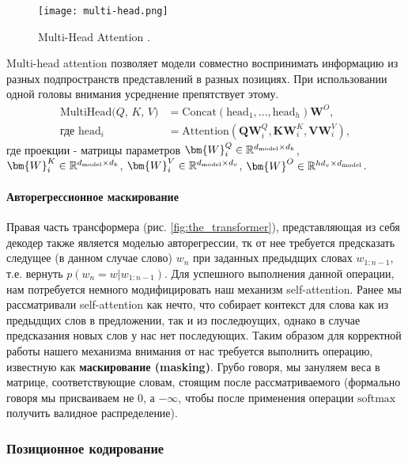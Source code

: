 \begin{figure}[h!]
    \centering
    \texttt{[image: multi-head.png]}
    \caption{Multi-Head Attention \cite{vaswani2017attention}.}
    \label{fig:multi-head}
\end{figure}

Multi-head attention позволяет модели совместно воспринимать информацию из 
разных подпространств представлений в разных позициях. При использовании одной 
головы внимания усреднение препятствует этому.
\begin{align*}
    \text{MultiHead($Q$, $K$, $V$)} &= \text{Concat}(\text{head}_1, ..., \text{head}_h)\bm{W}^O, \\
    \text{где } \text{head}_i &= \text{Attention}(\bm{Q}\bm{W}_i^Q, \bm{K}\bm{W}_i^K, \bm{V}\bm{W}_i^V),
\end{align*}
где проекции - матрицы параметров 
$\bm{W}_i^Q \in \mathbb{R}^{d_\text{\tiny model} \times d_k}$, 
$\bm{W}_i^K \in \mathbb{R}^{d_\text{\tiny model} \times d_k}$, 
$\bm{W}_i^V \in \mathbb{R}^{d_\text{\tiny model} \times d_v}$, 
$\bm{W}^O \in \mathbb{R}^{h d_v \times d_\text{\tiny model}}$.

\paragraph{Авторегрессионное маскирование}

Правая часть трансформера (рис. \ref{fig:the_transformer}), представляющая из себя 
декодер также является моделью авторегрессии, тк от нее требуется предсказать 
следущее (в данном случае слово) $w_n$ при заданных предыдщих словах $w_{1:n-1}$, 
т.е. вернуть $p(w_n = w|w_{1:n-1})$. Для успешного выполнения данной операции, нам 
потребуется немного модифицировать наш механизм self-attention. Ранее мы рассматривали 
self-attention как нечто, что собирает контекст для слова как из предыдщих слов в 
предложении, так и из последюущих, однако в случае предсказания новых слов у нас нет 
последующих. Таким образом для корректной работы нашего механизма внимания от нас 
требуется выполнить операцию, известную как \textbf{маскирование (masking)}. 
Грубо говоря, мы зануляем веса в матрице, соответствующие словам, стоящим после рассматриваемого 
(формально говоря мы присваиваем не 0, а $-\infty$, чтобы после применения операции 
$\text{softmax}$ получить валидное распределение).

\subsubsection{Позиционное кодирование}

